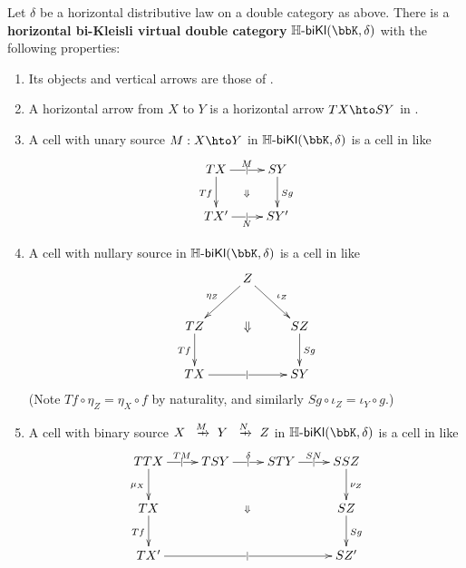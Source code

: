 \documentclass{amsart}
\newcommand{\K}{\bbK}
\newcommand{\Hbikl}[2]{\mathbb{H}\text{-}\mathsf{biKl}(#1,#2)}
\begin{document}
\begin{thm}
  Let $\delta$ be a horizontal distributive law on a double category as above.
  There is a \textbf{horizontal bi-Kleisli virtual double category} $\Hbikl{\K}{\delta}$ with the following properties:
  \begin{enumerate}
  \item Its objects and vertical arrows are those of \bbK.
  \item A horizontal arrow from $X$ to $Y$ is a horizontal arrow $T X \hto S Y$ in \bbK.
  \item A cell with unary source $M:X\hto Y$ in $\Hbikl\K\delta$ is a cell in \K like
    \[ \xymatrix{ T X \ar[r]|{|}^{M} \ar[d]_{Tf} \ar@{}[dr]|{\Downarrow} & S Y \ar[d]^{Sg}\\
      T X' \ar[r]|{|}_{N} & S Y' } \]
  \item A cell with nullary source in $\Hbikl\K\delta$ is a cell in \bbK like
    \[ \xymatrix{ & Z \ar[dl]_{\eta_Z} \ar[dr]^{\iota_Z} \\
      T Z \ar[d]_{T f} & \Downarrow & S Z \ar[d]^{S g} \\
      T X \ar[rr]|{|} && S Y } \]
    (Note $T f \circ \eta_Z = \eta_X \circ f$ by naturality, and similarly $S g \circ \iota_Z = \iota_Y \circ g$.)
  \item A cell with binary source $X\xhto{M} Y \xhto{N} Z$ in $\Hbikl\K\delta$ is a cell in \bbK like\label{item:hbikl-binary}
    \[ \xymatrix{ TTX \ar[r]|{|}^{T M} \ar[d]_{\mu_X} \ar@{}[ddrrr]|{\Downarrow} &
      T S Y \ar[r]|{|}^{\delta} & S T Y \ar[r]|{|}^{S N} & S S Z \ar[d]^{\nu_Z}\\
      T X \ar[d]_{T f} &&& S Z \ar[d]^{S g}\\
      T X' \ar[rrr]|{|} &&& S Z'}\]
  \end{enumerate}
\end{thm}
\end{document}
